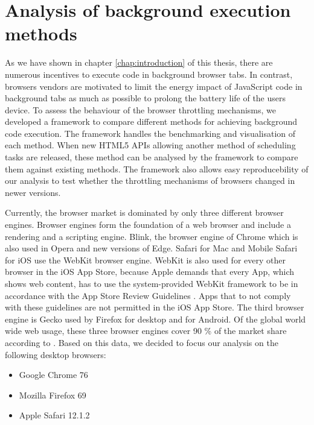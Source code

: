 \documentclass[
	ruledheaders=section,%
	class=report,%
	thesis={type=bachelor},%
	accentcolor=9c,%
	custommargins=true,%
	marginpar=false,%
	parskip=half-,%
	fontsize=11pt,%
]{tudapub}
\begin{document}
  
  \newpage
  \chapter{Analysis of background execution methods}
  \label{chap:analysis}

  As we have shown in chapter \ref{chap:introduction} of this thesis, there are numerous incentives to execute code in background browser tabs. In contrast, browsers vendors are motivated to limit the energy impact of JavaScript code in background tabs as much as possible to prolong the battery life of the users device. To assess the behaviour of the browser throttling mechanisms, we developed a framework to compare different methods for achieving background code execution. The framework handles the benchmarking and visualisation of each method. When new HTML5 APIs allowing another method of scheduling tasks are released, these method can be analysed by the framework to compare them against existing methods. The framework also allows easy reproducebility of our analysis to test whether the throttling mechanisms of browsers changed in newer versions.

  Currently, the browser market is dominated by only three different browser engines. Browser engines form the foundation of a web browser and include a rendering and a scripting engine. Blink, the browser engine of Chrome which is also used in Opera and new versions of Edge. Safari for Mac and Mobile Safari for iOS use the WebKit browser engine. WebKit is also used for every other browser in the iOS App Store, because Apple demands that every App, which shows web content, has to use the system-provided WebKit framework to be in accordance with the App Store Review Guidelines \cite{apple-app-review-guideline}. Apps that to not comply with these guidelines are not permitted in the iOS App Store. The third browser engine is Gecko used by Firefox for desktop and for Android. Of the global world wide web usage, these three browser engines cover 90 \% of the market share according to \cite{statcounter-global-browser-market-share}. Based on this data, we decided to focus our analysis on the following desktop browsers:

  \begin{itemize}
  \item Google Chrome 76
  \item Mozilla Firefox 69
  \item Apple Safari 12.1.2
  \end{itemize}
\end{document}
